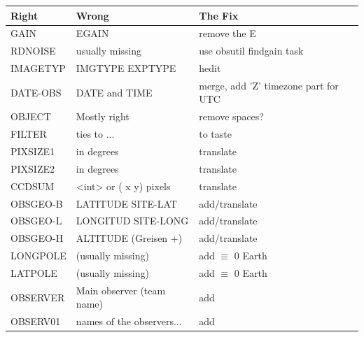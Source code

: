 \begin{table}[h!]
\centering
\begin{tabular}{ l  l l}
\hline
Right      & Wrong                                          & The Fix  \\
\hline
GAIN       & EGAIN                                          & remove the E \\
RDNOISE    & usually missing                                & use obsutil findgain task \\
IMAGETYP   & IMGTYPE  EXPTYPE                               & hedit   \\
DATE-OBS   & DATE and TIME                                  & merge, add 'Z' timezone part for UTC \\
OBJECT     & Mostly right                                   & remove spaces?   \\
FILTER     & ties to {\color{verbcolor}{\verb#ccdred$#}}... & to taste   \\
\hline
PIXSIZE1   & in degrees                                     & translate \\
PIXSIZE2   & in degrees                                     & translate  \\
CCDSUM     & <int> or ( x   y)  pixels                      & translate \\
\hline
OBSGEO-B   & LATITUDE SITE-LAT                              & add/translate \\
OBSGEO-L   & LONGITUD SITE-LONG                             & add/translate \\
OBSGEO-H   & ALTITUDE  (Greisen  +)                         & add/translate \\
LONGPOLE   & (usually missing)                              & add $\equiv$ 0 Earth \\
LATPOLE    & (usually missing)                              & add $\equiv$ 0 Earth\\
\hline
OBSERVER   & Main observer (team name)                      & add \\
OBSERV01   & names of the observers...                      & add \\

\end{tabular}
\end{table}
